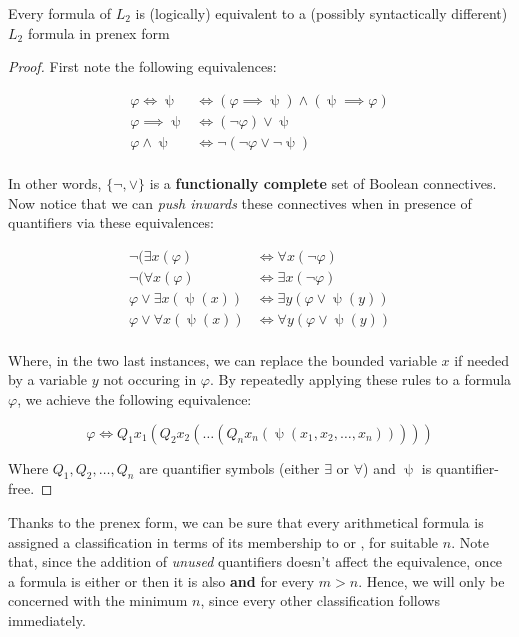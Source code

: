 \documentclass[../main.tex]{memoir}
\begin{document}
\begin{theorem}
  Every formula of $L_2$ is (logically) equivalent to a (possibly syntactically different) $L_2$ formula in prenex form
\end{theorem}
\begin{proof}
  First note the following equivalences:

  \begin{align*}
    \varphi \iff \uppsi & \iff (\varphi \implies \uppsi) \land (\uppsi \implies \varphi) \\
    \varphi \implies \uppsi & \iff (\neg \varphi) \lor \uppsi \\
    \varphi \land \uppsi & \iff \neg (\neg \varphi \lor \neg \uppsi) \\
  \end{align*}

  In other words, $\{\neg, \lor\}$ is a \textbf{functionally complete} set of Boolean connectives. Now notice that we can \textit{push inwards} these connectives when in presence of quantifiers via these equivalences:

  \begin{align*}
    \neg (\exists x (\varphi) & \iff \forall x (\neg \varphi) \\
    \neg (\forall x (\varphi) & \iff \exists x (\neg \varphi) \\
    \varphi \lor \exists x (\uppsi(x)) & \iff \exists y (\varphi \lor \uppsi(y)) \\
    \varphi \lor \forall x (\uppsi(x)) & \iff \forall y (\varphi \lor \uppsi(y)) \\
  \end{align*}

  Where, in the two last instances, we can replace the bounded variable $x$ if needed by a variable $y$ not occuring in $\varphi$. By repeatedly applying these rules to a formula $\varphi$, we achieve the following equivalence:

  \[
    \varphi \iff Q_1 x_1 (Q_2 x_2 (\ldots (Q_n x_n (\uppsi(x_1, x_2, \ldots, x_n)))))
  \]

  Where $Q_1, Q_2, \ldots, Q_n$ are quantifier symbols (either $\exists$ or $\forall$) and $\uppsi$ is quantifier-free.
\end{proof}

Thanks to the prenex form, we can be sure that every arithmetical formula is assigned a classification in terms of its membership to  or , for suitable $n$. Note that, since the addition of \textit{unused} quantifiers doesn't affect the equivalence, once a formula is either  or  then it is also  \textbf{and}  for every $m > n$. Hence, we will only be concerned with the minimum $n$, since every other classification follows immediately. \\
\end{document}
